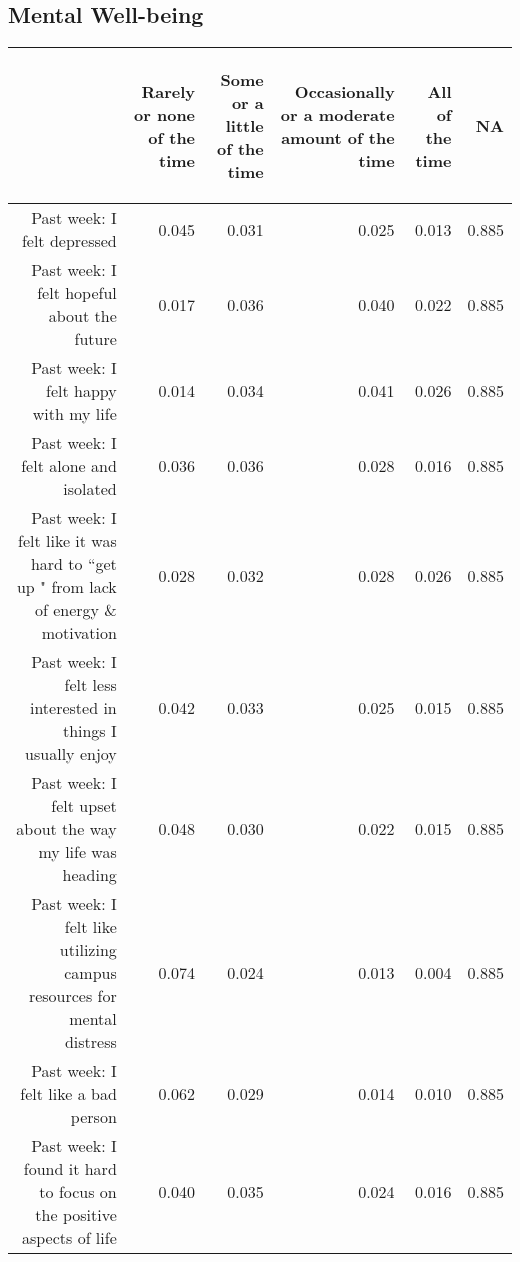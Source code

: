 \documentclass{article}\usepackage[]{graphicx}\usepackage[]{color}
\makeatletter
\newenvironment{kframe}{%
 \def\at@end@of@kframe{}%
 \ifinner\ifhmode%
  \def\at@end@of@kframe{\end{minipage}}%
  \begin{minipage}{\columnwidth}%
 \fi\fi%
 \def\FrameCommand##1{\hskip\@totalleftmargin \hskip-\fboxsep
 \colorbox{shadecolor}{##1}\hskip-\fboxsep
     \hskip-\linewidth \hskip-\@totalleftmargin \hskip\columnwidth}%
 \MakeFramed {\advance\hsize-\width
   \@totalleftmargin\z@ \linewidth\hsize
   \@setminipage}}%
 {\par\unskip\endMakeFramed%
 \at@end@of@kframe}
\makeatother
\begin{document}
\subsection{Mental Well-being}
\begin{table}[ht]
\centering
\begin{tabular}{rrrrrr}
  \hline
 & \begin{sideways} Rarely or none of the time \end{sideways} & \begin{sideways} Some or a little of the time \end{sideways} & \begin{sideways} Occasionally or a moderate amount of the time \end{sideways} & \begin{sideways} All of the time \end{sideways} & \begin{sideways} NA \end{sideways} \\ 
  \hline
Past week: I felt depressed & 0.045 & 0.031 & 0.025 & 0.013 & 0.885 \\ 
  Past week: I felt hopeful about the future & 0.017 & 0.036 & 0.040 & 0.022 & 0.885 \\ 
  Past week: I felt happy with my life & 0.014 & 0.034 & 0.041 & 0.026 & 0.885 \\ 
  Past week: I felt alone and isolated & 0.036 & 0.036 & 0.028 & 0.016 & 0.885 \\ 
  Past week: I felt like it was hard to ``get up " from lack of energy \& motivation & 0.028 & 0.032 & 0.028 & 0.026 & 0.885 \\ 
  	Past week: I felt less interested in things I usually enjoy & 0.042 & 0.033 & 0.025 & 0.015 & 0.885 \\ 
  	Past week: I felt upset about the way my life was heading & 0.048 & 0.030 & 0.022 & 0.015 & 0.885 \\ 
  Past week: I felt like utilizing campus resources for mental distress & 0.074 & 0.024 & 0.013 & 0.004 & 0.885 \\ 
  Past week: I felt like a bad person & 0.062 & 0.029 & 0.014 & 0.010 & 0.885 \\ 
  Past week: I found it hard to focus on the positive aspects of life & 0.040 & 0.035 & 0.024 & 0.016 & 0.885 \\ 
   \hline
\end{tabular}
\end{table}
\begin{kframe}

{\ttfamily\noindent\bfseries{}}\end{kframe}
\end{document}

